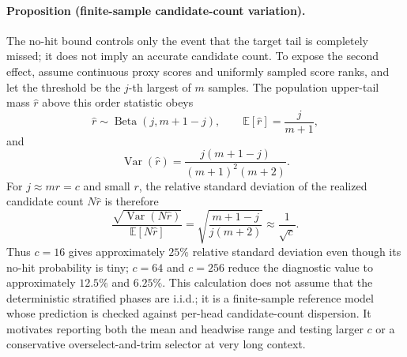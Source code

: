 \paragraph{Proposition (finite-sample candidate-count variation).}
The no-hit bound controls only the event that the target tail is completely
missed; it does not imply an accurate candidate count.  To expose the second
effect, assume continuous proxy scores and uniformly sampled score ranks, and
let the threshold be the $j$-th largest of $m$ samples.  The population
upper-tail mass $\widehat r$ above this order statistic obeys
\begin{equation}
 \widehat r\sim\operatorname{Beta}(j,m+1-j),\qquad
 \mathbb E[\widehat r]=\frac{j}{m+1},
 \label{eq:sample-quantile-beta}
\end{equation}
and
\begin{equation}
 \operatorname{Var}(\widehat r)
 =\frac{j(m+1-j)}{(m+1)^2(m+2)}.
 \label{eq:sample-quantile-variance}
\end{equation}
For $j\approx mr=c$ and small $r$, the relative standard deviation of the
realized candidate count $N\widehat r$ is therefore
\begin{equation}
 \frac{\sqrt{\operatorname{Var}(N\widehat r)}}
 {\mathbb E[N\widehat r]}
 =
 \sqrt{\frac{m+1-j}{j(m+2)}}
 \approx \frac{1}{\sqrt{c}}.
 \label{eq:candidate-count-relative-std}
\end{equation}
Thus $c=16$ gives approximately $25\%$ relative standard deviation even
though its no-hit probability is tiny; $c=64$ and $c=256$ reduce the
diagnostic value to approximately $12.5\%$ and $6.25\%$.  This calculation
does not assume that the deterministic stratified phases are i.i.d.; it is a
finite-sample reference model whose prediction is checked against per-head
candidate-count dispersion.  It motivates reporting both the mean and
headwise range and testing larger $c$ or a conservative overselect-and-trim
selector at very long context.

